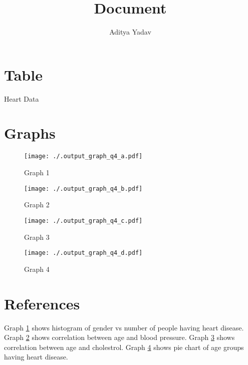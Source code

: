 \documentclass{article}
\title{Document}
\author{Aditya Yadav}
\begin{document}
\maketitle
\section{Table}
\begin{table}[h!]
\centering
\caption{Heart Data}
\end{table}
\section{Graphs}
\begin{figure}[h]
\texttt{[image: ./.output\_graph\_q4\_a.pdf]}
\caption{\label{graph_1} Graph 1}
\end{figure}
\begin{figure}[h]
\texttt{[image: ./.output\_graph\_q4\_b.pdf]}
\caption{\label{graph_2} Graph 2}
\end{figure}
\begin{figure}[h]
\texttt{[image: ./.output\_graph\_q4\_c.pdf]}
\caption{\label{graph_3} Graph 3}
\end{figure}
\begin{figure}[h]
\texttt{[image: ./.output\_graph\_q4\_d.pdf]}
\caption{\label{graph_4} Graph 4}
\end{figure}
\section{References}
Graph \ref{graph_1} shows histogram of gender vs number of people having heart disease. Graph \ref{graph_2} shows correlation between age and blood pressure. Graph \ref{graph_3} shows correlation between age and cholestrol. Graph \ref{graph_4} shows pie chart of age groups having heart disease.
\end{document}
